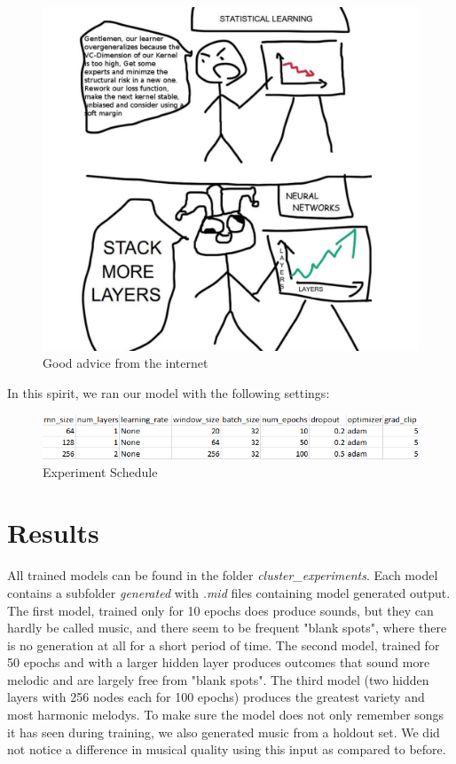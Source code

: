 \documentclass{article}
\begin{document}
\begin{figure}[H]
    \centering
    \includegraphics[scale=0.28]{stack_more_layers.png}
    \caption{Good advice from the internet}
    \label{fig:good_advice}
\end{figure}

In this spirit, we ran our model with the following settings:
\begin{figure}[H]
    \centering
    \includegraphics[scale=0.8]{experiment_schedule_2.png}
    \caption{Experiment Schedule}
    \label{fig:experiment_schedule1}
\end{figure}

\section{Results}
All trained models can be found in the folder \textit{cluster\_experiments}. Each model contains a subfolder \textit{generated} with \textit{.mid} files containing model generated output. The first model, trained only for 10 epochs does produce sounds, but they can hardly be called music, and there seem to be frequent "blank spots", where there is no generation at all for a short period of time. The second model, trained for 50 epochs and with a larger hidden layer produces outcomes that sound more melodic and are largely free from "blank spots". The third model (two hidden layers with 256 nodes each for 100 epochs) produces the greatest variety and most harmonic melodys. To make sure the model does not only remember songs it has seen during training, we also generated music from a holdout set. We did not notice a difference in musical quality using this input as compared to before.
\end{document}
